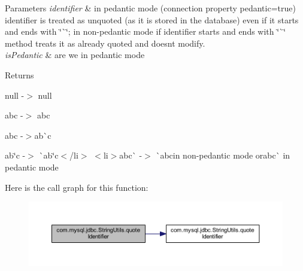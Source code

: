 \begin{DoxyParams}{Parameters}
{\em identifier} & in pedantic mode (connection property pedantic=true) identifier is treated as unquoted (as it is stored in the database) even if it starts and ends with \char`\"{}\`{}\char`\"{}; in non-\/pedantic mode if identifier starts and ends with \char`\"{}\`{}\char`\"{} method treats it as already quoted and doesn\textquotesingle{}t modify. \\
\hline
{\em is\+Pedantic} & are we in pedantic mode\\
\hline
\end{DoxyParams}
\begin{DoxyReturn}{Returns}

\begin{DoxyItemize}
\item null -\/$>$ null 
\item abc -\/$>$ {\ttfamily abc} 
\item ab{\ttfamily c -\/$>$}ab\`{}{\ttfamily c} 
\item ab\char`\"{}c -\/$>$ \`{}ab\char`\"{}c{\ttfamily $<$/li$>$ $<$li$>$}ab{\ttfamily c\`{} -\/$>$ \`{}ab}c{\ttfamily in non-\/pedantic mode or}{\ttfamily ab}{\ttfamily c}\`{} in pedantic mode 
\end{DoxyItemize}
\end{DoxyReturn}
Here is the call graph for this function\+:
\nopagebreak
\begin{figure}[H]
\begin{center}
\leavevmode
\includegraphics[width=350pt]{classcom_1_1mysql_1_1jdbc_1_1_string_utils_a7ecf14188b41e974d586d79f3295d4f1_cgraph}
\end{center}
\end{figure}
\mbox{\label{classcom_1_1mysql_1_1jdbc_1_1_string_utils_a5a12075fbc5dc15fb882600f8d424f39}} 
